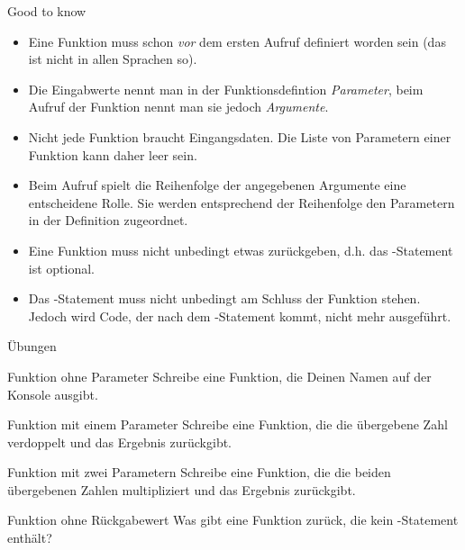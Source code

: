 \begin{frame}

\begin{block}{Good to know}
\pause 
\begin{itemize}[<+->]
	\item Eine Funktion muss schon \emph{vor} dem ersten Aufruf definiert worden sein (das ist nicht in allen Sprachen so). 
	\item Die Eingabwerte nennt man in der Funktionsdefintion \emph{Parameter}, beim Aufruf der Funktion nennt man sie jedoch \emph{Argumente}.
	\item Nicht jede Funktion braucht Eingangsdaten. Die Liste von Parametern einer Funktion kann daher leer sein.   
	\item Beim Aufruf spielt die Reihenfolge der angegebenen Argumente eine entscheidene Rolle. Sie werden entsprechend der Reihenfolge den Parametern in der Definition zugeordnet. 
	\item Eine Funktion muss nicht unbedingt etwas zurückgeben, d.h. das -Statement ist optional.
	\item Das -Statement muss nicht unbedingt am Schluss der Funktion stehen. Jedoch wird Code, der nach dem -Statement kommt, nicht mehr ausgeführt. 
\end{itemize}
\end{block}
\end{frame}

\begin{frame}{Übungen}

\begin{block}{Funktion ohne Parameter}
	\vspace{2pt}
Schreibe eine Funktion, die Deinen Namen auf der Konsole ausgibt. 
\end{block}
\vspace{12pt}
\begin{block}{Funktion mit einem Parameter}
\vspace{2pt}
Schreibe eine Funktion, die die übergebene Zahl verdoppelt und das Ergebnis zurückgibt. 
\end{block}
\vspace{12pt}
\begin{block}{Funktion mit zwei Parametern}
\vspace{2pt}
Schreibe eine Funktion, die die beiden übergebenen Zahlen multipliziert und das Ergebnis zurückgibt. 
\end{block}
\vspace{12pt}
\begin{block}{Funktion ohne Rückgabewert}
\vspace{2pt}
Was gibt eine Funktion zurück, die kein -Statement enthält?
\end{block}
\end{frame}

